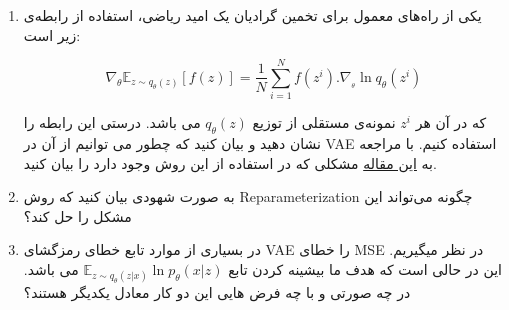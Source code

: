 \begin{enumerate}[label=(\alph*)]
	\item
	یکی از راه‌های معمول برای تخمین گرادیان یک امید ریاضی، استفاده از رابطه‌ی زیر است:
	
	$$
	{\nabla _\theta }{\mathbb{E}_{z \sim {q_\theta }\left( z \right)}}\left[ {f\left( z \right)} \right] = \frac{1}{N}\sum\limits_{i = 1}^N {f\left( {{z^i}} \right)} .{\nabla _{_\theta }}\ln {q_\theta }\left( {{z^i}} \right)
	$$
	
	که در آن هر $z^i$ نمونه‌ی مستقلی از توزیع ${{q_\theta }\left( z \right)}$ می باشد. درستی این رابطه را نشان دهید و بیان کنید که چطور می توانیم از آن در VAE استفاده کنیم.
	با مراجعه به
	\href{http://icml.cc/2012/papers/687.pdf}{این مقاله}
	مشکلی که در استفاده از این روش وجود دارد را بیان کنید.
	
	\item
	به صورت شهودی بیان کنید که روش Reparameterization چگونه می‌تواند این مشکل را حل کند؟
	
	 \item
	 در بسیاری از موارد تابع خطای رمزگشای VAE را خطای MSE در نظر میگیریم. این در حالی است که هدف ما بیشینه کردن تابع
	 $
	 {\mathbb{E}_{z \sim {q_\theta }\left( {z|x} \right)}}\ln {p_\theta }\left( {x|z} \right)
	 $
	 می باشد. در چه صورتی و با چه فرض هایی این دو کار معادل یکدیگر هستند؟
	 
\end{enumerate}
